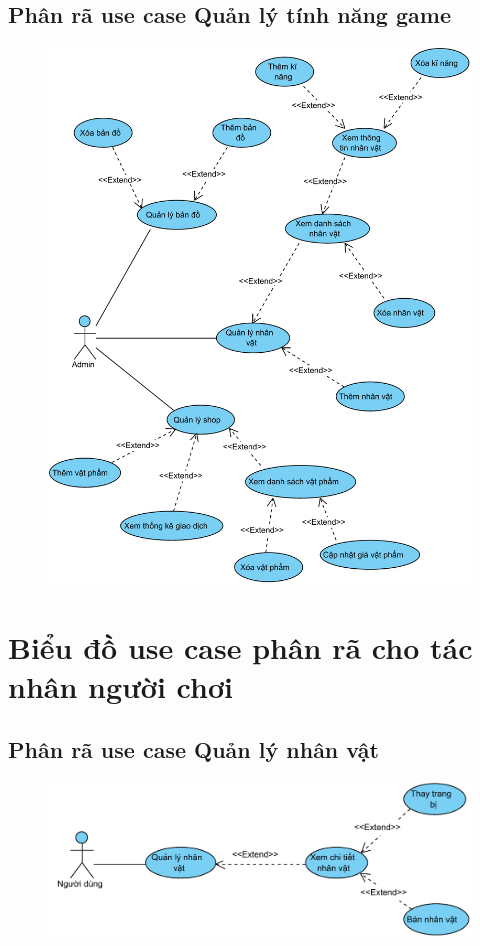\documentclass[3p]{elsarticle}
\begin{document}
\subsection{Phân rã use case Quản lý tính năng game}
\begin{figure}[!htbp]
	\hspace*{-.5in}
	\centering
	\includegraphics[scale=.7]{images/usecases/admin_GameManagement.pdf}
\end{figure}
\newpage
\section{Biểu đồ use case phân rã cho tác nhân người chơi}
\subsection{Phân rã use case Quản lý nhân vật}
\begin{figure}[!htbp]
	\hspace*{-.5in}
	\centering
	\includegraphics[scale=.7]{images/usecases/gamer_CharacterManagement.pdf}
\end{figure}
\end{document}
